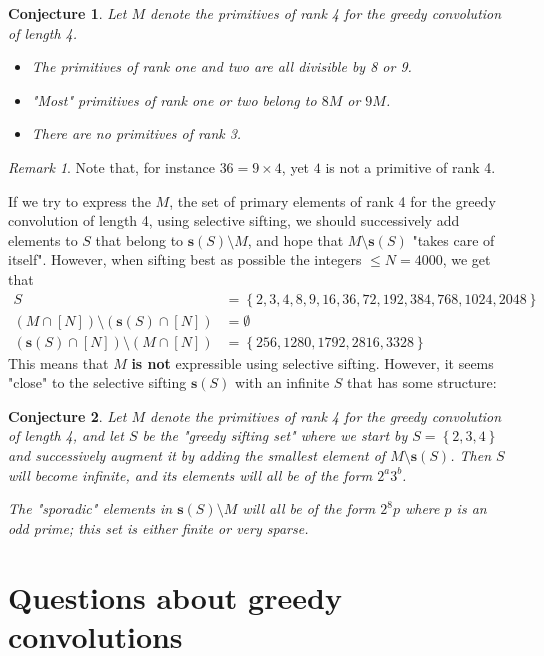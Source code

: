\documentclass[12pt]{article}
\theoremstyle{definition}
\theoremstyle{remark}
\newtheorem{remark}{Remark}
\theoremstyle{plain}
\newtheorem{conjecture}{Conjecture}
\newcommand{\set}[1]{\left\{{#1}\right\}}
\newcommand{\ssift}[1]{\mathbf{s}({#1})}
\begin{document}
\begin{conjecture}
Let \(M\) denote the primitives of rank 4 for the greedy convolution of length 4.
\begin{itemize}
\item The primitives of rank one and two are all divisible by 8 or 9.
\item "Most" primitives of rank one or two belong to \(8M\) or \(9M\).
\item There are no primitives of rank 3.
\end{itemize}
\end{conjecture}
\begin{remark}
Note that, for instance \(36=9 \times 4\), yet \(4\) is not a primitive of rank 4.
\end{remark}

If we try to express the \(M\),
the set of primary elements of rank 4 for the greedy convolution of length 4,
using selective sifting, we should successively add elements to \(S\) that belong to
\(\ssift{S} \setminus M\), and hope that \(M \setminus \ssift{S}\) "takes care of itself".
However, when sifting best as possible the integers \(\le N=4000\), we get that
\begin{equation}
\label{eq:org7f2dcc3}
\begin{split}
S & = \set{2,3,4,8,9,16,36,72,192,384,768,1024,2048} \\
(M \cap[N]) \setminus (\ssift{S} \cap [N]) & = \emptyset \\
(\ssift{S} \cap [N]) \setminus (M \cap[N])  & = \set{256,1280,1792,2816,3328}
\end{split}
\end{equation}
This means that \(M\) \textbf{is not} expressible using selective sifting. However,
it seems "close" to the selective sifting \(\ssift{S}\) with an infinite \(S\)
that has some structure:
\begin{conjecture}
Let \(M\) denote the primitives of rank 4 for the greedy convolution of length 4,
and let \(S\) be the "greedy sifting set" where we start by \(S=\set{2,3,4}\) and
successively augment it by adding the smallest element of
\(M \setminus \ssift{S}\).
Then \(S\) will become infinite, and its elements will all be of the form \(2^{a}3^{b}\).

The "sporadic" elements in
\(\ssift{S}  \setminus M\) will all be of the form \(2^{8}p\) where \(p\) is an odd prime; this set
is either finite or very sparse.
\end{conjecture}
\section{Questions about greedy convolutions}
\label{sec:org44d0849}
\end{document}
